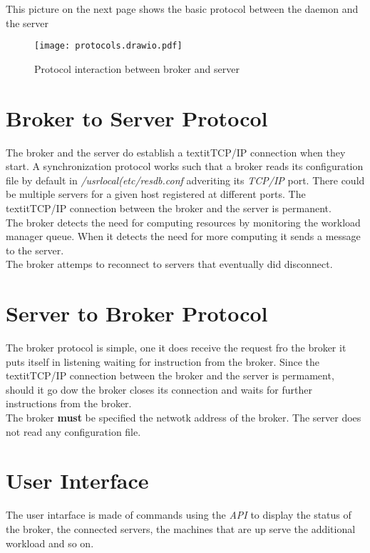 \documentclass{report}
\begin{document}
This picture on the next page shows the basic protocol between the daemon and the server

\begin{figure}[h]
  \centering
  \texttt{[image: protocols.drawio.pdf]}
    \caption{Protocol interaction between broker and server}
    \label{fig:enter-label}
\end{figure}

\section{Broker to Server Protocol}
The broker and the server do establish a textit{TCP/IP} connection when they start.
A synchronization protocol works such that a broker reads its configuration file
by default in \textit{/usrlocal(etc/resdb.conf} adveriting its \textit{TCP/IP} port.
There could be multiple servers for a given host registered at different ports.
The textit{TCP/IP} connection between the broker and the server is permanent.\\

The broker detects the need for computing resources by monitoring the workload
manager queue. When it detects the need for more computing it sends a message to
the server.\\

The broker attemps to reconnect to servers that eventually did disconnect.

\section{Server to Broker Protocol}

The broker protocol is simple, one it does receive the request fro the broker it
puts itself in listening waiting for instruction from the broker. Since the
textit{TCP/IP} connection between the broker and the server is permament, should
it go dow the broker closes its connection and waits for further instructions
from the broker.\\

The broker \textbf{must} be specified the netwotk address of the broker. The
server does not read any configuration file.

\section{User Interface}
The user intarface is made of commands using the \textit{API} to display the
status of the broker, the connected servers, the machines that are up serve the
additional workload and so on.
\end{document}
